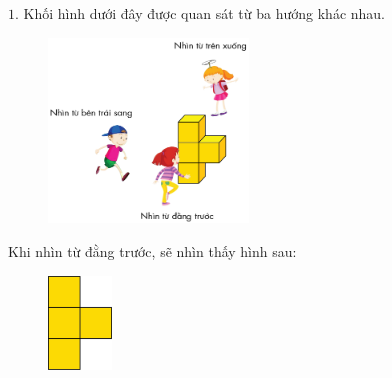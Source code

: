 \newpage
\everymath{\color{toancuabi}}
\graphicspath{{../timhieucungbi/quansatcackhoihinh/}}
\begingroup
{} 
\centering
\endgroup

	$1.$ Khối hình dưới đây được quan sát từ ba hướng khác nhau.
	\begin{center}
		\begin{thBox}
			\begin{multicols}{2}
				\begin{figure}[H]
					\centering
					\vspace*{-10pt}
					\captionsetup{labelformat= empty, justification=centering}
					\includegraphics[width=0.475\textwidth]{1}
					\vspace*{-10pt}
				\end{figure}
				\vspace*{-16pt}
				Khi nhìn từ đằng trước, sẽ nhìn thấy hình sau:
				\begin{figure}[H]
					\centering
					\captionsetup{labelformat= empty, justification=centering}
					\includegraphics[width=0.15\textwidth]{2}
					\vspace*{5pt}
				\end{figure}
			\end{multicols}
		\end{thBox}
	\end{center}
